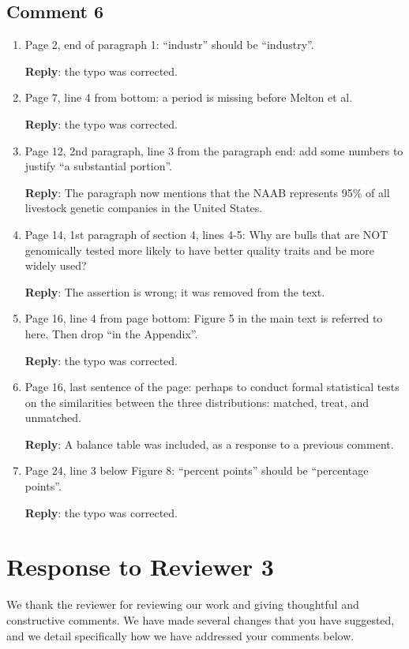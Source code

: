 \documentclass[12pt,letterpaper]{article}
\begin{document}
\subsection*{Comment 6}
\begin{enumerate}
    \item Page 2, end of paragraph 1: “industr” should be “industry”.

    \textbf{Reply}: the typo was corrected.
    \item Page 7, line 4 from bottom: a period is missing before Melton et al.

    \textbf{Reply}: the typo was corrected.
    \item Page 12, 2nd paragraph, line 3 from the paragraph end: add some numbers to justify ``a substantial portion''.

    \textbf{Reply}: The paragraph now mentions that the NAAB represents 95\% of all livestock genetic companies in the United States.
    \item Page 14, 1st paragraph of section 4, lines 4-5: Why are bulls that are NOT genomically tested more likely to have better quality traits and be more widely used?

    \textbf{Reply}: The assertion is wrong; it was removed from the text.
    \item Page 16, line 4 from page bottom: Figure 5 in the main text is referred to here. Then drop ``in the Appendix''.

    \textbf{Reply}: the typo was corrected.
    \item Page 16, last sentence of the page: perhaps to conduct formal statistical tests on the similarities between the three distributions: matched, treat, and unmatched.

    \textbf{Reply}: A balance table was included, as a response to a previous comment.
    \item Page 24, line 3 below Figure 8: ``percent points'' should be ``percentage points''.
   
    \textbf{Reply}: the typo was corrected.
\end{enumerate}

%
%    
\newpage

\section*{Response to Reviewer 3}
\noindent We thank the reviewer for reviewing our work and giving thoughtful and constructive comments. We have made several changes that you have suggested, and we detail specifically how we have addressed your comments below.
\end{document}
